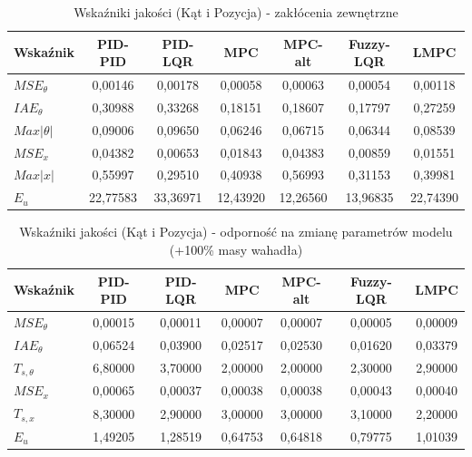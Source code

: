 \begin{table}[h!]
    \centering
    \caption{Wskaźniki jakości (Kąt i Pozycja) - zakłócenia zewnętrzne}
    \label{tab:results_wind}
    \begin{tabular}{|l|c|c|c|c|c|c|}
        \hline
        Wskaźnik & PID-PID & PID-LQR & MPC & MPC-alt & Fuzzy-LQR & LMPC \\ \hline
        $MSE_\theta$ & \phantom{0}0,00146 & \phantom{0}0,00178 & \phantom{0}0,00058 & \phantom{0}0,00063 & \phantom{0}0,00054 & \phantom{0}0,00118 \\ \hline
        $IAE_\theta$ & \phantom{0}0,30988 & \phantom{0}0,33268 & \phantom{0}0,18151 & \phantom{0}0,18607 & \phantom{0}0,17797 & \phantom{0}0,27259 \\ \hline
        $Max |\theta|$ & \phantom{0}0,09006 & \phantom{0}0,09650 & \phantom{0}0,06246 & \phantom{0}0,06715 & \phantom{0}0,06344 & \phantom{0}0,08539 \\ \hline
        \hline
        $MSE_x$ & \phantom{0}0,04382 & \phantom{0}0,00653 & \phantom{0}0,01843 & \phantom{0}0,04383 & \phantom{0}0,00859 & \phantom{0}0,01551 \\ \hline
        $Max |x|$ & \phantom{0}0,55997 & \phantom{0}0,29510 & \phantom{0}0,40938 & \phantom{0}0,56993 & \phantom{0}0,31153 & \phantom{0}0,39981 \\ \hline
        \hline
        $E_{u}$ & 22,77583 & 33,36971 & 12,43920 & 12,26560 & 13,96835 & 22,74390 \\ \hline
    \end{tabular}
\end{table}

\begin{table}[h!]
    \centering
    \caption{Wskaźniki jakości (Kąt i Pozycja) - odporność na zmianę parametrów modelu (+100\% masy wahadła)}
    \label{tab:results_robustness}
    \begin{tabular}{|l|c|c|c|c|c|c|}
        \hline
        Wskaźnik & PID-PID & PID-LQR & MPC & MPC-alt & Fuzzy-LQR & LMPC \\ \hline
        $MSE_\theta$ & 0,00015 & 0,00011 & 0,00007 & 0,00007 & 0,00005 & 0,00009 \\ \hline
        $IAE_\theta$ & 0,06524 & 0,03900 & 0,02517 & 0,02530 & 0,01620 & 0,03379 \\ \hline
        $T_{s, \theta}$ & 6,80000 & 3,70000 & 2,00000 & 2,00000 & 2,30000 & 2,90000 \\ \hline
        \hline
        $MSE_x$ & 0,00065 & 0,00037 & 0,00038 & 0,00038 & 0,00043 & 0,00040 \\ \hline
        $T_{s, x}$& 8,30000 & 2,90000 & 3,00000 & 3,00000 & 3,10000 & 2,20000 \\ \hline
        \hline
        $E_{u}$ & 1,49205 & 1,28519 & 0,64753 & 0,64818 & 0,79775 & 1,01039 \\ \hline
    \end{tabular}
\end{table}

